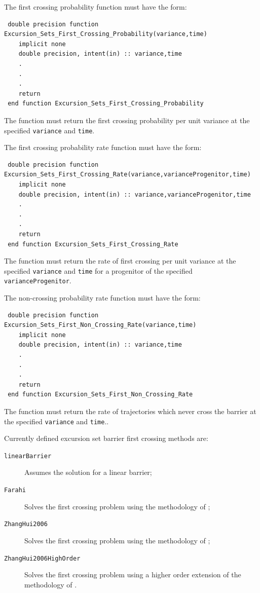 The first crossing probability function must have the form:
\begin{verbatim}
 double precision function Excursion_Sets_First_Crossing_Probability(variance,time)
    implicit none
    double precision, intent(in) :: variance,time
    .
    .
    .
    return
 end function Excursion_Sets_First_Crossing_Probability
\end{verbatim}
The function must return the first crossing probability per unit variance at the specified {\tt variance} and {\tt time}.

The first crossing probability rate function must have the form:
\begin{verbatim}
 double precision function Excursion_Sets_First_Crossing_Rate(variance,varianceProgenitor,time)
    implicit none
    double precision, intent(in) :: variance,varianceProgenitor,time
    .
    .
    .
    return
 end function Excursion_Sets_First_Crossing_Rate
\end{verbatim}
The function must return the rate of first crossing per unit variance at the specified {\tt variance} and {\tt time} for a progenitor of the specified {\tt varianceProgenitor}.

The non-crossing probability rate function must have the form:
\begin{verbatim}
 double precision function Excursion_Sets_First_Non_Crossing_Rate(variance,time)
    implicit none
    double precision, intent(in) :: variance,time
    .
    .
    .
    return
 end function Excursion_Sets_First_Non_Crossing_Rate
\end{verbatim}
The function must return the rate of trajectories which never cross the barrier at the specified {\tt variance} and {\tt time}..

Currently defined excursion set barrier first crossing methods are:
\begin{description}
 \item [{\tt linearBarrier}] Assumes the solution for a linear barrier;
 \item [{\tt Farahi}] Solves the first crossing problem using the methodology of \cite{benson_dark_2012};
 \item [{\tt ZhangHui2006}] Solves the first crossing problem using the methodology of \cite{zhang_random_2006};
 \item [{\tt ZhangHui2006HighOrder}] Solves the first crossing problem using a higher order extension of the methodology of \cite{zhang_random_2006}.
\end{description}

